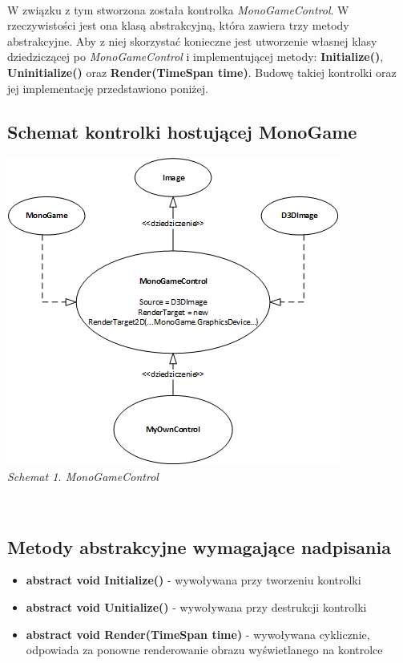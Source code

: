 \documentclass{article}
\begin{document}
~\\W związku z tym stworzona została kontrolka \textit{MonoGameControl}. W rzeczywistości jest ona klasą abstrakcyjną, która zawiera trzy metody abstrakcyjne. Aby z niej skorzystać konieczne jest utworzenie własnej klasy dziedziczącej po \textit{MonoGameControl} i implementującej metody: \textbf{Initialize()}, \textbf{Uninitialize()} oraz \textbf{Render(TimeSpan time)}. Budowę takiej kontrolki oraz jej implementację przedstawiono poniżej.

\subsection{Schemat kontrolki hostującej MonoGame}

\begin{center}
\includegraphics[scale=1.0]{MonoGameControlSchemat}\\
\textit{Schemat 1. MonoGameControl}
\end{center}
~\\
\subsection{Metody abstrakcyjne wymagające nadpisania}
\begin{itemize}
  \item \textbf{abstract void Initialize()} - wywoływana przy tworzeniu kontrolki
  \item \textbf{abstract void Unitialize()} - wywoływana przy destrukcji kontrolki
  \item \textbf{abstract void Render(TimeSpan time)} - wywoływana cyklicznie, odpowiada za ponowne renderowanie obrazu wyświetlanego na kontrolce
\end{itemize}
\end{document}
